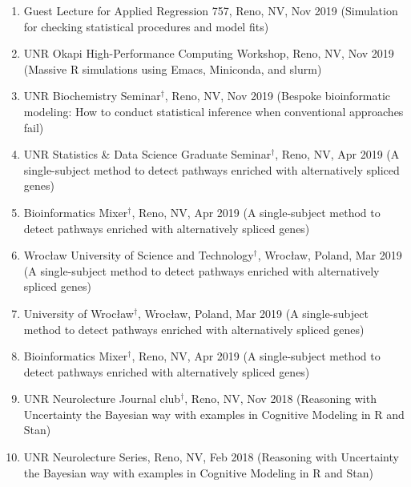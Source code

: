 \documentclass[paper=a4,fontsize=11pt]{scrartcl} %
\newcommand{\TalkEntry}[4]{
		\noindent #1, #2, #3 #4}
\begin{document}
\vspace{-7pt}
\begin{enumerate}

\item\TalkEntry{Guest Lecture for Applied Regression 757}{Reno, NV}{Nov 2019}{(Simulation for checking statistical procedures and model fits)}
  
\item\TalkEntry{UNR Okapi High-Performance Computing Workshop}{Reno, NV}{Nov 2019}{(Massive R simulations using Emacs, Miniconda, and slurm)}
  
\item\TalkEntry{UNR Biochemistry Seminar$^{\dagger}$}{Reno, NV}{Nov 2019}{(Bespoke bioinformatic modeling: How to conduct statistical inference when conventional approaches fail)}
  
\item\TalkEntry{UNR Statistics \& Data Science Graduate Seminar$^{\dagger}$}{Reno, NV}{Apr 2019}{(A single-subject method to detect pathways enriched with alternatively spliced genes)}
  
\item\TalkEntry{Bioinformatics Mixer$^{\dagger}$}{Reno, NV}{Apr 2019}{(A single-subject method to detect pathways enriched with alternatively spliced genes)}

\item\TalkEntry{Wrocław University of Science and Technology$^{\dagger}$}{Wrocław, Poland}{Mar 2019}{(A single-subject method to detect pathways enriched with alternatively spliced genes)}

  \item\TalkEntry{University of Wrocław$^{\dagger}$}{Wrocław, Poland}{Mar 2019}{(A single-subject method to detect pathways enriched with alternatively spliced genes)}

  \item\TalkEntry{Bioinformatics Mixer$^{\dagger}$}{Reno, NV}{Apr 2019}{(A single-subject method to detect pathways enriched with alternatively spliced genes)}
  
  \item\TalkEntry{UNR Neurolecture Journal club$^{\dagger}$}{Reno, NV}{Nov 2018}{(Reasoning with Uncertainty the Bayesian way with examples in Cognitive Modeling in R and Stan)}
  
  \item\TalkEntry{UNR Neurolecture Series}{Reno, NV}{Feb 2018}{(Reasoning with Uncertainty the Bayesian way with examples in Cognitive Modeling in R and Stan)}


\end{enumerate}
\end{document}
